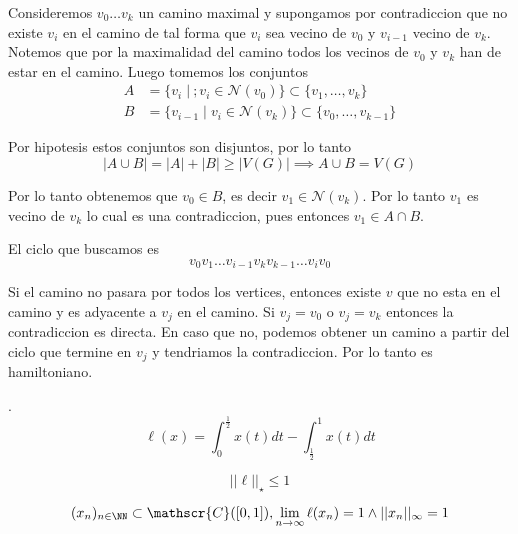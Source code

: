 \documentclass[a4paper,oneside,10.5pt]{USMArt}
\begin{document}
\begin{sol}
  Consideremos $v_{0} \dots v_{k}$ un camino maximal y supongamos por contradiccion que no existe
  $v_{i}$ en el camino de tal forma que $v_{i}$ sea vecino de $v_{0}$ y $v_{i - 1}$ vecino de $v_{k}$. Notemos que por la maximalidad del camino todos los vecinos de $v_{0}$ y $v_{k}$ han de estar en el camino. Luego tomemos los conjuntos
  \begin{align*}
    A &= \{v_{i} \; |\ ; v_{i} \in \mathcal{N}(v_{0})\} \subset \{v_{1}, \dots, v_{k}\}\\
    B &= \{v_{i - 1} \; | \; v_{i} \in \mathcal{N}(v_{k})\} \subset \{v_{0}, \dots, v_{k - 1}\}
  \end{align*}

  Por hipotesis estos conjuntos son disjuntos, por lo tanto
  \begin{equation*}
    |A \cup B| = |A| + |B| \geq |V(G)| \implies A \cup B = V(G)
  \end{equation*}

  Por lo tanto obtenemos que $v_{0} \in B$, es decir $v_{1} \in \mathcal{N}(v_{k})$. Por lo tanto $v_{1}$ es vecino de $v_{k}$ lo cual es una contradiccion, pues entonces $v_{1} \in A \cap B$.

  El ciclo que buscamos es
  \begin{equation*}
    v_{0}v_{1}\dots v_{i - 1} v_{k} v_{k -1} \dots v_{i} v_{0}
  \end{equation*}

  Si el camino no pasara por todos los vertices, entonces existe $v$ que no esta en el camino y es adyacente a $v_{j}$
  en el camino. Si $v_{j} = v_{0}$ o $v_{j} = v_{k}$ entonces la contradiccion es directa. En caso que no, podemos obtener un camino a partir del ciclo que termine en $v_{j}$ y tendriamos la contradiccion. Por lo tanto es hamiltoniano.
\end{sol}

\newpage

\begin{sol}.
  \begin{equation*}
    \ell(x) = \int_{0}^{\frac{1}{2}} x(t) dt - \int_{\frac{1}{2}}^{1} x(t) dt
  \end{equation*}

  \begin{equation*}
    ||\ell||_{\star} \leq 1
  \end{equation*}

  \begin{equation*}
    (x_{n})_{n \in \NN} \subset \mathscr{C}([0, 1]), \lim_{n \to \infty} \ell(x_{n}) = 1 \land ||x_{n}||_{\infty} = 1
  \end{equation*}
\end{sol}
\end{document}
